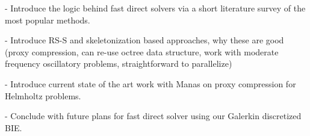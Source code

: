 - Introduce the logic behind fast direct solvers via a short literature survey of the most popular methods.

- Introduce RS-S and skeletonization based approaches, why these are good (proxy compression, can re-use octree data structure, work with moderate frequency oscillatory problems, straightforward to parallelize)

- Introduce current state of the art work with Manas on proxy compression for Helmholtz problems.

- Conclude with future plans for fast direct solver using our Galerkin discretized BIE.

